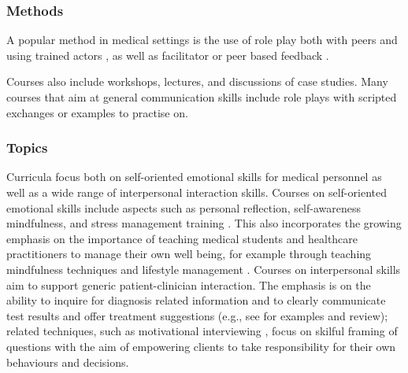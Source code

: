 \documentclass[prodmode,acmtochi]{acmsmall}
\newcommand{\GeraldineFIX}[1]{}
\begin{document}
\subsubsection*{Methods} A popular method in medical settings is the use of role play both with peers and using trained actors  \cite{Stepien2006,Stiefel2010,Kalet2004,Barth2011}, as well as facilitator or peer based feedback \cite{Rao2007}. 
\GeraldineFIX{G: \textbf{(G: on what?\ on the role plays, or is this another method ie not clear what 'followed by' refers to ... popularity or how role play is used)}}
Courses also include workshops, lectures, and discussions of case studies. Many courses that aim at general communication skills include role plays with scripted exchanges or examples to practise on. 
 \textbf{\GeraldineFIX{G: (G:\ how are these different to role plays??) P: These a specific sub-part of role plays (i.e., you can have other role plays without scripted exchange). I believe it is worth mentioning as such scripted (iu.e., fixed) exchanges can be readily supported by technology.}}


\subsubsection*{Topics} 
Curricula focus both on self-oriented emotional skills for medical personnel as well as a wide range of interpersonal interaction skills. 
%
Courses on self-oriented emotional skills include aspects such as personal reflection, self-awareness mindfulness, and stress management training \cite{Shapiro2000,Epstein1999,Satterfield2007}. This also incorporates the growing emphasis on the importance of teaching medical students and healthcare practitioners to manage their own well being, for example through teaching mindfulness techniques and lifestyle management \cite{Hassed2009}.
%
Courses on interpersonal skills aim to support generic patient-clinician interaction. The emphasis is on the ability to inquire for diagnosis related information and to clearly communicate test results and offer  treatment suggestions (e.g., see \cite{Kalet2004,Barth2011} for examples and review); related techniques, such as  motivational interviewing \cite{Hettema2005},  focus on skilful framing of questions with the aim of empowering  clients to take responsibility for their own behaviours and decisions.  
%
 
\end{document}
